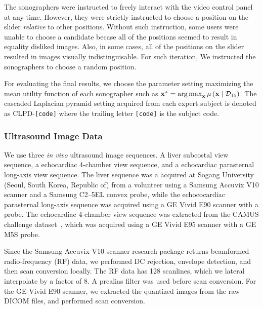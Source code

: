 The sonographers were instructed to freely interact with the video control panel at any time.
However, they were strictly instructed to choose a position on the slider \textit{relative} to other positions.
Without such instruction, some users were unable to choose a candidate becase all of the positions seemed to result in equality disliked images.
Also, in some cases, all of the positions on the slider resulted in images visually indistinguisable.
For such iteration, We instructed the sonographers to choose a random position.

For evaluating the final results, we choose the parameter setting maximizing the mean utility function of each sonographer such as \( \mathbf{x}^* = \operatorname*{arg\,max}_{\mathbf{x}} \mu\left(\mathbf{x} \mid \mathcal{D}_{15} \right) \).
The cascaded Laplacian pyramid setting acquired from each expert subject is denoted as CLPD-\texttt{[code]} where the trailing letter \texttt{[code]} is the subject code.

\subsubsection{Ultrasound Image Data}
We use three \textit{in vivo} ultrasound image sequences.
A liver subcostal view sequence, a echocardiac 4-chamber view sequence, and a echocardiac parasternal long-axis view sequence.
The liver sequence was a acquired at Sogang University (Seoul, South Korea, Republic of) from a volunteer using a Samsung Accuvix V10 scanner and a Samsung C2--5EL convex probe, while the echococardiac parasternal long-axis sequence was acquired using a GE Vivid E90 scanner with a probe.
The echocardiac 4-chamber view sequence was extracted from the CAMUS challenge dataset~\cite{leclerc_deep_2019}, which was acquired using a GE Vivid E95 scanner with a GE M5S probe.

Since the Samsung Accuvix V10 scanner research package returns beamformed radio-frequency (RF) data, we performed DC rejection, envelope detection, and then scan conversion locally.
The RF data has 128 scanlines, which we lateral interpolate by a factor of 8.
A prealias filter was used before scan conversion.
For the GE Vivid E90 scanner, we extracted the quantized images from the raw DICOM files, and performed scan conversion.

